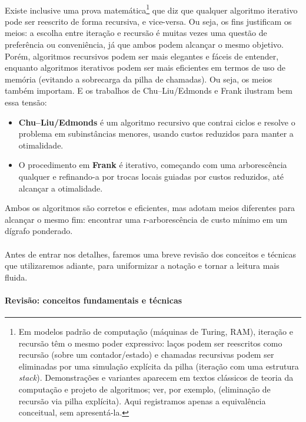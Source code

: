 \documentclass[12pt,a4paper]{article}
\def\emph#1{#1}%
\begin{document}
\paragraph{}
Existe inclusive uma prova matemática\footnote{Em modelos padrão de computação (máquinas de Turing, RAM), \emph{iteração} e \emph{recursão} têm o mesmo poder expressivo: laços podem ser reescritos como recursão (sobre um contador/estado) e chamadas recursivas podem ser eliminadas por uma simulação explícita da pilha (iteração com uma estrutura \textit{stack}). Demonstrações e variantes aparecem em textos clássicos de teoria da computação e projeto de algoritmos; ver, por exemplo, \cite{cormen2009} (eliminação de recursão via pilha explícita). Aqui registramos apenas a equivalência conceitual, sem apresentá-la.} que diz que qualquer algoritmo iterativo pode ser reescrito de forma recursiva, e vice-versa. Ou seja, \emph{os fins justificam os meios}: a escolha entre iteração e recursão é muitas vezes uma questão de preferência ou conveniência, já que ambos podem alcançar o mesmo objetivo. Porém, algoritmos recursivos podem ser mais elegantes e fáceis de entender, enquanto algoritmos iterativos podem ser mais eficientes em termos de uso de memória (evitando a sobrecarga da pilha de chamadas). Ou seja, os meios também importam. E os trabalhos de Chu–Liu/Edmonds e Frank ilustram bem essa tensão:
\begin{itemize}\setlength{\itemsep}{2pt}
    \item \textbf{Chu–Liu/Edmonds} é um algoritmo recursivo que contrai ciclos e resolve o problema em subinstâncias menores, usando custos reduzidos para manter a otimalidade.
    \item O procedimento em \textbf{Frank} é iterativo, começando com uma arborescência qualquer e refinando-a por trocas locais guiadas por custos reduzidos, até alcançar a otimalidade.
\end{itemize}
Ambos os algoritmos são corretos e eficientes, mas adotam meios diferentes para alcançar o mesmo fim: encontrar uma r-arborescência de custo mínimo em um dígrafo ponderado.

\paragraph{}
Antes de entrar nos detalhes, faremos uma breve revisão dos conceitos e técnicas que utilizaremos adiante, para uniformizar a notação e tornar a leitura mais fluida.

\paragraph{Revisão: conceitos fundamentais e técnicas}
\end{document}
